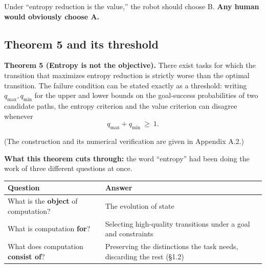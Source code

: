 \documentclass[11pt]{article}
\renewenvironment{quote}
  {\def\FrameCommand{{\color{gray!60}\vrule width 2pt}\hspace{8pt}}%
   \MakeFramed{\advance\hsize-\width \FrameRestore}\begin{itshape}}
  {\end{itshape}\endMakeFramed}
\begin{document}
Under ``entropy reduction is the value,'' the robot should choose B. \textbf{Any human would obviously choose A.}

\hypertarget{theorem-5-and-its-threshold}{%
\subsection{Theorem 5 and its threshold}\label{theorem-5-and-its-threshold}}

\begin{quote}
\textbf{Theorem 5 (Entropy is not the objective).} There exist tasks for which the transition that maximizes entropy reduction is strictly worse than the optimal transition. The failure condition can be stated exactly as a threshold: writing \(q_{\max},q_{\min}\) for the upper and lower bounds on the goal-success probabilities of two candidate paths, the entropy criterion and the value criterion can disagree whenever
\[q_{\max}+q_{\min}\ \ge\ 1.\]
\end{quote}

(The construction and its numerical verification are given in Appendix A.2.)

\textbf{What this theorem cuts through:} the word ``entropy'' had been doing the work of three different questions at once.

\begin{longtable}[]{@{}ll@{}}
\toprule
\begin{minipage}[b]{0.47\columnwidth}\raggedright
Question\strut
\end{minipage} & \begin{minipage}[b]{0.47\columnwidth}\raggedright
Answer\strut
\end{minipage}\tabularnewline
\midrule
\endhead
\begin{minipage}[t]{0.47\columnwidth}\raggedright
What is the \textbf{object} of computation?\strut
\end{minipage} & \begin{minipage}[t]{0.47\columnwidth}\raggedright
The evolution of state\strut
\end{minipage}\tabularnewline
\begin{minipage}[t]{0.47\columnwidth}\raggedright
What is computation \textbf{for}?\strut
\end{minipage} & \begin{minipage}[t]{0.47\columnwidth}\raggedright
Selecting high-quality transitions under a goal and constraints\strut
\end{minipage}\tabularnewline
\begin{minipage}[t]{0.47\columnwidth}\raggedright
What does computation \textbf{consist of}?\strut
\end{minipage} & \begin{minipage}[t]{0.47\columnwidth}\raggedright
Preserving the distinctions the task needs, discarding the rest (\S{}1.2)\strut
\end{minipage}\tabularnewline
\bottomrule
\end{longtable}
\end{document}
